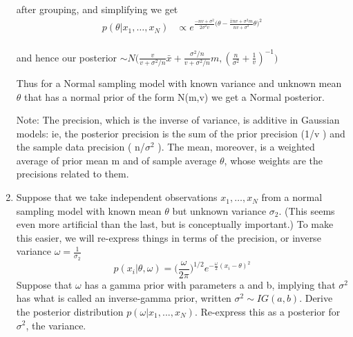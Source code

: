 \documentclass{homework}
\begin{document}
\begin{enumerate}[label=(\Alph*)]
\par after grouping, and simplifying we get
\begin{equation} \begin{split}
p(\theta | x_1,\dots, x_N) &\propto e^{\frac{-nv + \sigma^2}{2\sigma^2v}\big(\theta - \frac{\bar{x}nv + \sigma^2m}{nv + \sigma^2}\theta\big)^2} \\
\end{split} \end{equation}
\par and hence our posterior $\sim N\big(\frac{v}{v + \sigma^2/n}\bar{x}+\frac{\sigma^2/n}{v + \sigma^2/n}m, ( \frac{n}{\sigma^2} + \frac{1}{v} )^{-1}\big)$
\par
\par \noindent Thus for a Normal sampling model with known variance and unknown mean $\theta$ that has a normal prior of the form N(m,v) we get a Normal posterior.
\par \noindent *Note: The precision, which is the inverse of variance, is additive in Gaussian models: ie, the posterior precision is the sum of the prior precision (1/v ) and the sample data precision ( n/$\sigma^2$ ). The mean, moreover, is a weighted average of prior mean m and of sample average $\theta$, whose weights are the precisions related to them.

\item Suppose that we take independent observations $x_1, \dots , x_N$  from a normal sampling model with known mean $\theta$ but unknown variance $\sigma_2$. (This seems even more artificial than the last, but is conceptually important.) To make this easier, we will re-express things in terms of the precision, or inverse variance $\omega = \frac{1}{\sigma_2}$
$$p(x_i | \theta, \omega) = \big( \frac{\omega}{2\pi} \big)^{1/2} e^{-\frac{\omega}{2}(x_i - \theta)^2}$$
Suppose that $\omega$ has a gamma prior with parameters a and b, implying that $\sigma^2$ has what is called an inverse-gamma prior, written $\sigma^2 \sim IG(a, b)$. Derive the posterior distribution $p(\omega | x_1,...,x_N)$. Re-express this as a posterior for $\sigma^2$, the variance.


\end{enumerate}
\end{document}
